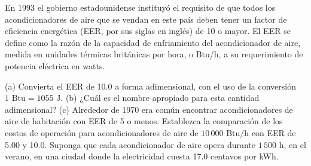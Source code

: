 \item En 1993 el gobierno estadounidense instituyó el requisito de que todos los acondicionadores de aire que se vendan en este país deben tener un factor de eficiencia energética (EER, por sus siglas en inglés) de 10 o mayor. El EER se define como la razón de la capacidad de enfriamiento del acondicionador de aire, medida en unidades térmicas británicas por hora, o Btu/h, a su requerimiento de potencia eléctrica en watts. 

(a) Convierta el EER de 10.0 a forma adimensional, con el uso de la conversión $1\text{ Btu} = 1055\text{ J}$. 
(b) ¿Cuál es el nombre apropiado para esta cantidad adimensional? 
(c) Alrededor de 1970 era común encontrar acondicionadores de aire de habitación con EER de 5 o menos. Establezca la comparación de los costos de operación para acondicionadores de aire de $10\,000\text{ Btu/h}$ con EER de 5.00 y 10.0. Suponga que cada acondicionador de aire opera durante $1\,500\text{ h}$, en el verano, en una ciudad donde la electricidad cuesta 17.0 centavos por kWh.
